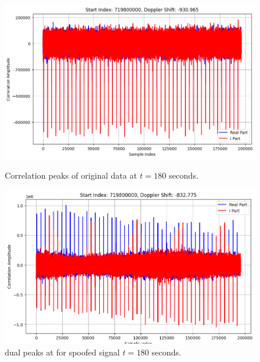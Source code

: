 \documentclass[12pt]{report}
\begin{document}
\begin{figure}[H]
  \centering
  \begin{minipage}{0.48\textwidth}
    \centering
    \includegraphics[width=\textwidth]{t180.png}
    \caption{Correlation peaks of original data at $t = 180$ seconds.}
    \label{fig:t180}
  \end{minipage}
  \hfill
  \begin{minipage}{0.48\textwidth}
    \centering
    \includegraphics[width=\textwidth]{t180_sp.png}
    \caption{dual peaks at for spoofed signal $t = 180$ seconds.}
    \label{fig:t180_sp}
  \end{minipage}
\end{figure}
\end{document}
